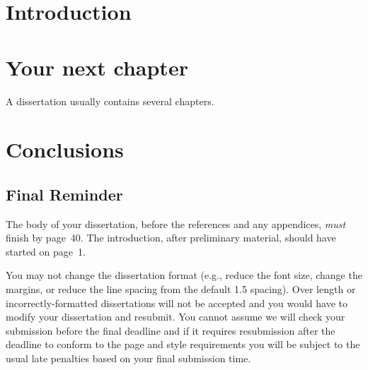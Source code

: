 \documentclass[msc,deptreport,dsti]{infthesis} %
\begin{document}
\chapter{Introduction}


\chapter{Your next chapter}

A dissertation usually contains several chapters.

\chapter{Conclusions}

\section{Final Reminder}

The body of your dissertation, before the references and any appendices,
\emph{must} finish by page~40. The introduction, after preliminary material,
should have started on page~1.

You may not change the dissertation format (e.g., reduce the font
size, change the margins, or reduce the line spacing from the default
1.5 spacing). Over length or incorrectly-formatted dissertations will
not be accepted and you would have to modify your dissertation and
resubmit.  You cannot assume we will check your submission before the
final deadline and if it requires resubmission after the deadline to
conform to the page and style requirements you will be subject to the
usual late penalties based on your final submission time.




% 
% 
% 
\end{document}
